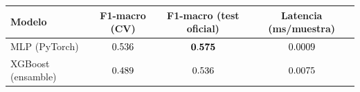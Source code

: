 \begin{tabular}{lccc}
\toprule
Modelo & F1-macro (CV) & F1-macro (test oficial) & Latencia (ms/muestra) \\
\midrule
MLP (PyTorch)      & $0.536$ & $\mathbf{0.575}$ & $0.0009$ \\
XGBoost (ensamble) & $0.489$ & $0.536$ & $0.0075$ \\
\bottomrule
\end{tabular}